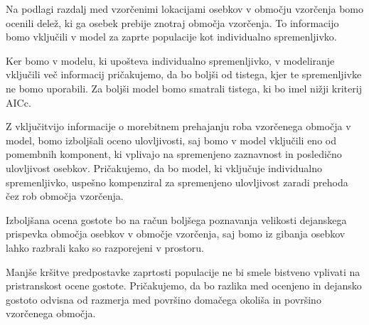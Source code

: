 Na podlagi razdalj med vzorčenimi lokacijami osebkov v območju vzorčenja bomo ocenili delež, ki ga osebek prebije znotraj območja vzorčenja. To informacijo bomo vključili v model za zaprte populacije kot individualno spremenljivko.

Ker bomo v modelu, ki upošteva individualno spremenljivko, v modeliranje vključili več informacij pričakujemo, da bo boljši od tistega, kjer te spremenljivke ne bomo uporabili. Za boljši model bomo smatrali tistega, ki bo imel nižji kriterij AICc.

Z vključitvijo informacije o morebitnem prehajanju roba vzorčenega območja v model, bomo izboljšali oceno ulovljivosti, saj bomo v model vključili eno od pomembnih komponent, ki vplivajo na spremenjeno zaznavnost in posledično ulovljivost osebkov. Pričakujemo, da bo model, ki vključuje individualno spremenljivko, uspešno kompenziral za spremenjeno ulovljivost zaradi prehoda čez rob območja vzorčenja.

Izboljšana ocena gostote bo na račun boljšega poznavanja velikosti dejanskega prispevka območja osebkov v območje vzorčenja, saj bomo iz gibanja osebkov lahko razbrali kako so razporejeni v prostoru.

Manjše kršitve predpostavke zaprtosti populacije ne bi smele bistveno vplivati na pristranskost ocene gostote. Pričakujemo, da bo razlika med ocenjeno in dejansko gostoto odvisna od razmerja med površino domačega okoliša in površino vzorčenega območja.
